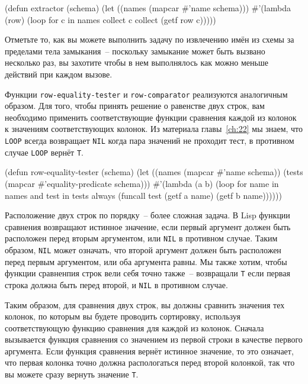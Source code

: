 \begin{myverb}
(defun extractor (schema)
  (let ((names (mapcar #'name schema)))
    #'(lambda (row)
        (loop for c in names collect c collect (getf row c)))))
\end{myverb}

Отметьте то, как вы можете выполнить задачу по извлечению имён из схемы за пределами тела
замыкания~-- поскольку замыкание может быть вызвано несколько раз, вы захотите чтобы в нем
выполнялось как можно меньше действий при каждом вызове.

Функции \lstinline{row-equality-tester} и \lstinline{row-comparator} реализуются аналогичным
образом.  Для того, чтобы принять решение о равенстве двух строк, вам необходимо применить
соответствующие функции сравнения каждой из колонок к значениям соответствующих колонок.
Из материала главы~\ref{ch:22} мы знаем, что \lstinline{LOOP} всегда возвращает \lstinline{NIL}
когда пара значений не проходит тест, в противном случае \lstinline{LOOP} вернёт \lstinline{T}.

\begin{myverb}
(defun row-equality-tester (schema)
  (let ((names (mapcar #'name schema))
        (tests (mapcar #'equality-predicate schema)))
    #'(lambda (a b)
        (loop for name in names and test in tests
           always (funcall test (getf a name) (getf b name))))))
\end{myverb}

Расположение двух строк по порядку~-- более сложная задача.  В Lisp функции сравнения
возвращают истинное значение, если первый аргумент должен быть расположен перед вторым
аргументом, или \lstinline{NIL} в противном случае.  Таким образом, \lstinline{NIL} может означать,
что второй аргумент должен быть расположен перед первым аргументом, или оба аргумента
равны. Мы также хотим, чтобы функции сравненпия строк вели себя точно также~-- возвращали
\lstinline{T} если первая строка должна быть перед второй, и \lstinline{NIL} в противном случае.

Таким образом, для сравнения двух строк, вы должны сравнить значения тех колонок, по
которым вы будете проводить сортировку, используя соответствующую функцию сравнения для
каждой из колонок.  Сначала вызывается функция сравнения со значением из первой строки в
качестве первого аргумента.  Если функция сравнения вернёт истинное значение, то это
означает, что первая колонка точно должна распологаться перед второй колонкой, так что вы
можете сразу вернуть значение \lstinline{T}.

